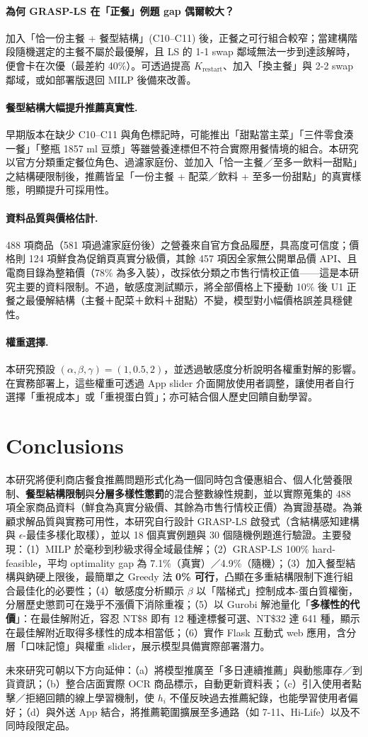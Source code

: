 \documentclass[a4paper]{article}
\begin{document}
\paragraph{為何 GRASP-LS 在「正餐」例題 gap 偶爾較大？} 加入「恰一份主餐 + 餐型結構」(C10--C11) 後，正餐之可行組合較窄；當建構階段隨機選定的主餐不屬於最優解，且 LS 的 1-1 swap 鄰域無法一步到達該解時，便會卡在次優（最差約 40\%）。可透過提高 $K_{\text{restart}}$、加入「換主餐」與 2-2 swap 鄰域，或如部署版退回 MILP 後備來改善。

\paragraph{餐型結構大幅提升推薦真實性.} 早期版本在缺少 C10--C11 與角色標記時，可能推出「甜點當主菜」「三件零食湊一餐」「整瓶 1857 ml 豆漿」等雖營養達標但不符合實際用餐情境的組合。本研究以官方分類重定餐位角色、過濾家庭份、並加入「恰一主餐／至多一飲料一甜點」之結構硬限制後，推薦皆呈「一份主餐 + 配菜／飲料 + 至多一份甜點」的真實樣態，明顯提升可採用性。

\paragraph{資料品質與價格估計.} 488 項商品（581 項過濾家庭份後）之營養來自官方食品履歷，具高度可信度；價格則 124 項鮮食為促銷頁真實分級價，其餘 457 項因全家無公開單品價 API、且電商目錄為整箱價（78\% 為多入裝），改採依分類之市售行情校正值——這是本研究主要的資料限制。不過，敏感度測試顯示，將全部價格上下擾動 10\% 後 U1 正餐之最優解結構（主餐＋配菜＋飲料＋甜點）不變，模型對小幅價格誤差具穩健性。

\paragraph{權重選擇.} 本研究預設 $(\alpha, \beta, \gamma)=(1, 0.5, 2)$，並透過敏感度分析說明各權重對解的影響。在實務部署上，這些權重可透過 App slider 介面開放使用者調整，讓使用者自行選擇「重視成本」或「重視蛋白質」；亦可結合個人歷史回饋自動學習。

\section{Conclusions}
本研究將便利商店餐食推薦問題形式化為一個同時包含優惠組合、個人化營養限制、\textbf{餐型結構限制}與\textbf{分層多樣性懲罰}的混合整數線性規劃，並以實際蒐集的 488 項全家商品資料（鮮食為真實分級價、其餘為市售行情校正價）為實證基礎。為兼顧求解品質與實務可用性，本研究自行設計 GRASP-LS 啟發式（含結構感知建構與 $\epsilon$-最佳多樣化取樣），並以 18 個真實例題與 30 個隨機例題進行驗證。主要發現：（1）MILP 於毫秒到秒級求得全域最佳解；（2）GRASP-LS 100\% hard-feasible，平均 optimality gap 為 7.1\%（真實）／4.9\%（隨機）；（3）加入餐型結構與鈉硬上限後，最簡單之 Greedy 法 \textbf{0\% 可行}，凸顯在多重結構限制下進行組合最佳化的必要性；（4）敏感度分析顯示 $\beta$ 以「階梯式」控制成本-蛋白質權衡，分層歷史懲罰可在幾乎不漲價下消除重複；（5）以 Gurobi 解池量化「\textbf{多樣性的代價}」：在最佳解附近，容忍 NT\$8 即有 12 種達標餐可選、NT\$32 達 641 種，顯示在最佳解附近取得多樣性的成本相當低；（6）實作 Flask 互動式 web 應用，含分層「口味記憶」與權重 slider，展示模型具備實際部署潛力。

未來研究可朝以下方向延伸：（a）將模型推廣至「多日連續推薦」與動態庫存／到貨資訊；（b）整合店面實際 OCR 商品標示，自動更新資料表；（c）引入使用者點擊／拒絕回饋的線上學習機制，使 $h_i$ 不僅反映過去推薦紀錄，也能學習使用者偏好；（d）與外送 App 結合，將推薦範圍擴展至多通路（如 7-11、Hi-Life）以及不同時段限定品。
\end{document}
